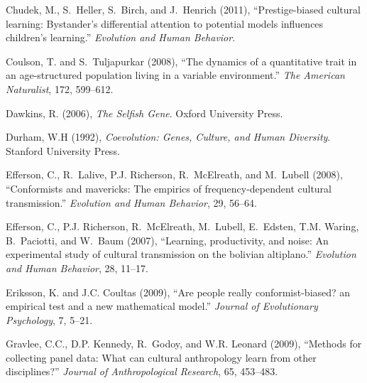 \documentclass[11pt]{article}
\begin{document}
\begin{thebibliography}{32}
Chudek, M., S.~Heller, S.~Birch, and J.~Henrich (2011),
  \enquote{Prestige-biased cultural learning: Bystander's differential
  attention to potential models influences children's learning.}
  \emph{Evolution and Human Behavior}.

Coulson, T. and S.~Tuljapurkar (2008), \enquote{The dynamics of a quantitative
  trait in an age-structured population living in a variable environment.}
  \emph{The American Naturalist}, 172, 599--612.

Dawkins, R. (2006), \emph{The Selfish Gene}. Oxford University Press.

Durham, W.H (1992), \emph{Coevolution: Genes, Culture, and Human Diversity}.
  Stanford University Press.

Efferson, C., R.~Lalive, P.J. Richerson, R.~McElreath, and M.~Lubell (2008),
  \enquote{Conformists and mavericks: The empirics of frequency-dependent
  cultural transmission.} \emph{Evolution and Human Behavior}, 29, 56--64.

Efferson, C., P.J. Richerson, R.~McElreath, M.~Lubell, E.~Edsten, T.M. Waring,
  B.~Paciotti, and W.~Baum (2007), \enquote{Learning, productivity, and noise:
  An experimental study of cultural transmission on the bolivian altiplano.}
  \emph{Evolution and Human Behavior}, 28, 11--17.

Eriksson, K. and J.C. Coultas (2009), \enquote{Are people really
  conformist-biased? an empirical test and a new mathematical model.}
  \emph{Journal of Evolutionary Psychology}, 7, 5--21.

Gravlee, C.C., D.P. Kennedy, R.~Godoy, and W.R. Leonard (2009),
  \enquote{Methods for collecting panel data: What can cultural anthropology
  learn from other disciplines?} \emph{Journal of Anthropological Research},
  65, 453--483.


\end{thebibliography}
\end{document}
